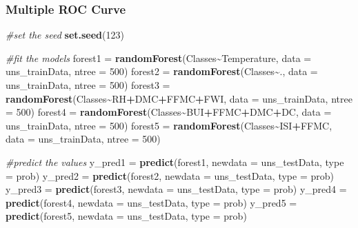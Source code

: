 \documentclass[
]{article}
\newenvironment{Shaded}{\begin{snugshade}}{\end{snugshade}}
\newcommand{\AttributeTok}[1]{\textcolor[rgb]{0.13,0.29,0.53}{#1}}
\newcommand{\CommentTok}[1]{\textcolor[rgb]{0.56,0.35,0.01}{\textit{#1}}}
\newcommand{\DecValTok}[1]{\textcolor[rgb]{0.00,0.00,0.81}{#1}}
\newcommand{\FunctionTok}[1]{\textcolor[rgb]{0.13,0.29,0.53}{\textbf{#1}}}
\newcommand{\NormalTok}[1]{#1}
\newcommand{\OtherTok}[1]{\textcolor[rgb]{0.56,0.35,0.01}{#1}}
\newcommand{\SpecialCharTok}[1]{\textcolor[rgb]{0.81,0.36,0.00}{\textbf{#1}}}
\newcommand{\StringTok}[1]{\textcolor[rgb]{0.31,0.60,0.02}{#1}}
\begin{document}
\subsubsection{Multiple ROC Curve}\label{multiple-roc-curve-6}

\begin{Shaded}
\begin{Highlighting}[]
\CommentTok{\#set the seed}
\FunctionTok{set.seed}\NormalTok{(}\DecValTok{123}\NormalTok{)}

\CommentTok{\#fit the models}
\NormalTok{forest1 }\OtherTok{=} \FunctionTok{randomForest}\NormalTok{(Classes}\SpecialCharTok{\textasciitilde{}}\NormalTok{Temperature, }\AttributeTok{data =}\NormalTok{ uns\_trainData, }\AttributeTok{ntree =} \DecValTok{500}\NormalTok{)}
\NormalTok{forest2 }\OtherTok{=} \FunctionTok{randomForest}\NormalTok{(Classes}\SpecialCharTok{\textasciitilde{}}\NormalTok{., }\AttributeTok{data =}\NormalTok{ uns\_trainData, }\AttributeTok{ntree =} \DecValTok{500}\NormalTok{)}
\NormalTok{forest3 }\OtherTok{=} \FunctionTok{randomForest}\NormalTok{(Classes}\SpecialCharTok{\textasciitilde{}}\NormalTok{RH}\SpecialCharTok{+}\NormalTok{DMC}\SpecialCharTok{+}\NormalTok{FFMC}\SpecialCharTok{+}\NormalTok{FWI, }\AttributeTok{data =}\NormalTok{ uns\_trainData, }\AttributeTok{ntree =} \DecValTok{500}\NormalTok{)}
\NormalTok{forest4 }\OtherTok{=} \FunctionTok{randomForest}\NormalTok{(Classes}\SpecialCharTok{\textasciitilde{}}\NormalTok{BUI}\SpecialCharTok{+}\NormalTok{FFMC}\SpecialCharTok{+}\NormalTok{DMC}\SpecialCharTok{+}\NormalTok{DC, }\AttributeTok{data =}\NormalTok{ uns\_trainData, }\AttributeTok{ntree =} \DecValTok{500}\NormalTok{)}
\NormalTok{forest5 }\OtherTok{=} \FunctionTok{randomForest}\NormalTok{(Classes}\SpecialCharTok{\textasciitilde{}}\NormalTok{ISI}\SpecialCharTok{+}\NormalTok{FFMC, }\AttributeTok{data =}\NormalTok{ uns\_trainData, }\AttributeTok{ntree =} \DecValTok{500}\NormalTok{)}

\CommentTok{\#predict the values}
\NormalTok{y\_pred1 }\OtherTok{=} \FunctionTok{predict}\NormalTok{(forest1, }\AttributeTok{newdata =}\NormalTok{ uns\_testData, }\AttributeTok{type =} \StringTok{\textquotesingle{}prob\textquotesingle{}}\NormalTok{)}
\NormalTok{y\_pred2 }\OtherTok{=} \FunctionTok{predict}\NormalTok{(forest2, }\AttributeTok{newdata =}\NormalTok{ uns\_testData, }\AttributeTok{type =} \StringTok{\textquotesingle{}prob\textquotesingle{}}\NormalTok{)}
\NormalTok{y\_pred3 }\OtherTok{=} \FunctionTok{predict}\NormalTok{(forest3, }\AttributeTok{newdata =}\NormalTok{ uns\_testData, }\AttributeTok{type =} \StringTok{\textquotesingle{}prob\textquotesingle{}}\NormalTok{)}
\NormalTok{y\_pred4 }\OtherTok{=} \FunctionTok{predict}\NormalTok{(forest4, }\AttributeTok{newdata =}\NormalTok{ uns\_testData, }\AttributeTok{type =} \StringTok{\textquotesingle{}prob\textquotesingle{}}\NormalTok{)}
\NormalTok{y\_pred5 }\OtherTok{=} \FunctionTok{predict}\NormalTok{(forest5, }\AttributeTok{newdata =}\NormalTok{ uns\_testData, }\AttributeTok{type =} \StringTok{\textquotesingle{}prob\textquotesingle{}}\NormalTok{)}


\end{Highlighting}
\end{Shaded}
\end{document}
